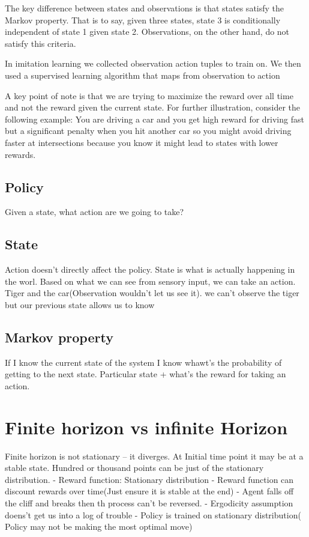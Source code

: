 \documentclass{article}
\begin{document}
The key difference between states and observations is that states satisfy the Markov property. That is to say, given three states, state 3 is conditionally independent of state 1 given state 2. Observations, on the other hand, do not satisfy this criteria.

In imitation learning we collected observation action tuples to train on. We then used a supervised learning algorithm that maps from observation to action


A key point of note is that we are trying to maximize the reward over all time and not the reward given the current state. For further illustration, consider the following example: You are driving a car and you get high reward for driving fast but a significant penalty when you hit another car so you might avoid driving faster at intersections because you know it might lead to states with lower rewards.




\subsection{Policy}
Given a state, what action are we going to take?

\subsection{State}
Action doesn't directly affect the policy. State is what is actually
happening in the worl.  Based on what we can see from sensory input,
we can take an action.  Tiger and the car(Observation wouldn't let us
see it). we can't observe the tiger but our previous state allows us
to know

\subsection{Markov property}
If I know the current state of the system I know whawt's the
probability of getting to the next state. Particular state + what's
the reward for taking an action.

\section{Finite horizon vs infinite Horizon}
Finite horizon is not stationary -- it diverges.
At Initial time point it may be at a stable state. Hundred or thousand points can be just of the stationary distribution.
- Reward function: Stationary distribution
- Reward function can discount rewards over time(Just ensure it is stable at the end)
- Agent falls off the cliff and breaks then th process can't be reversed.
- Ergodicity assumption doens't get us into a log of trouble
- Policy is trained on stationary distribution( Policy may not be making the most optimal move)
\end{document}
